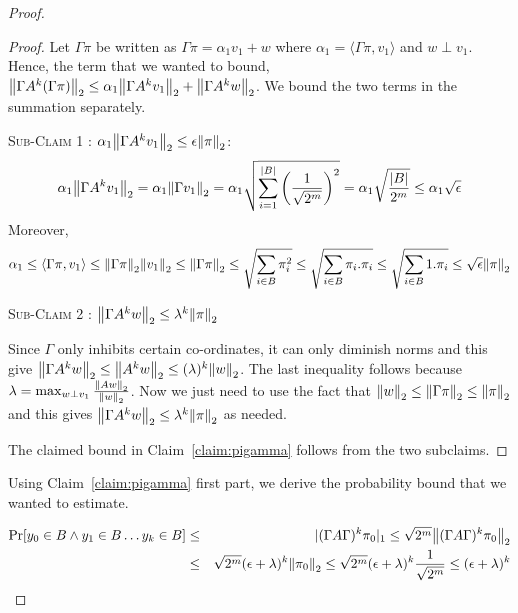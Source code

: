\begin{proof}
\begin{proof}
Let $\Gamma\pi$ be written as $\Gamma\pi = \alpha_1 v_1 + w$ where $\alpha_1 = \langle \Gamma \pi, v_1 \rangle$ and $w \perp v_1$. 
Hence, the term that we wanted to bound, ${\left\lVert\Gamma A^k (\Gamma \pi)\right\rVert}_2 \le \alpha_1 {\left\lVert\Gamma A^k v_1\right\rVert}_2 + {\left\lVert\Gamma A^k w\right\rVert}_2$. We bound the two terms in the summation separately.
\begin{description}
\item{\textsc{Sub-Claim 1} : ${\alpha_1 {\left\lVert\Gamma A^k v_1\right\rVert}_2 \le \epsilon{\left\lVert\pi\right\rVert}_2}$:}
$$ \alpha_1 {\left\lVert\Gamma A^k v_1\right\rVert}_2 = \alpha_1 {\left\lVert\Gamma v_1\right\rVert}_2 = \alpha_1 \sqrt{\sum_{i=1}^{|B|} \left( \frac{1}{\sqrt{2^{m}}} \right)^2 } = \alpha_1 \sqrt{\frac{|B|}{2^m}} \le \alpha_1 \sqrt{\epsilon}$$
Moreover, 
$$
\alpha_1 \le \langle \Gamma \pi, v_1 \rangle \le {\left\lVert\Gamma \pi\right\rVert}_2{\left\lVert v_1\right\rVert}_2 \le {\left\lVert\Gamma \pi\right\rVert}_2 \le \sqrt{\sum_{i \in B} \pi_i^2} \le  \sqrt{\sum_{i \in B} \pi_i.\pi_i} \le \sqrt{\sum_{i \in B} 1.\pi_i}  \le  \sqrt{\epsilon} {\left\lVert\pi\right\rVert}_2
$$

\item{\textsc{Sub-Claim 2} : ${\left\lVert\Gamma A^k w\right\rVert}_2 \le \lambda^k{\left\lVert\pi\right\rVert}_2$}

Since $\Gamma$ only inhibits certain co-ordinates, it can only diminish norms and this give ${\left\lVert\Gamma A^k w\right\rVert}_2 \le {\left\lVert A^kw\right\rVert}_2 \le (\lambda)^k{\left\lVert w\right\rVert}_2$. The last inequality follows because  $\lambda = \max_{w \perp v_1} \frac{{\left\lVert Aw\right\rVert}_2}{{\left\lVert w\right\rVert}_2}$. Now we just need to use the fact that ${\left\lVert w\right\rVert}_2 \le {\left\lVert\Gamma \pi\right\rVert}_2 \le {\left\lVert\pi\right\rVert}_2 $ and this gives ${\left\lVert\Gamma A^k w\right\rVert}_2 \le \lambda^k{\left\lVert\pi\right\rVert}_2$ as needed.
\end{description} 

\noindent The claimed bound in Claim~\ref{claim:pigamma} follows from the two subclaims. 
\end{proof}
\noindent Using Claim~\ref{claim:pigamma} first part, we derive the probability bound that we wanted to estimate.

\begin{eqnarray*}
\Pr[y_0 \in B \land y_1 \in B \ldots y_k \in B] & \le & |(\Gamma A\Gamma)^k \pi_0|_1 \le \sqrt{2^m}{\left\lVert(\Gamma A\Gamma)^k \pi_0\right\rVert}_2\\
& \le & \sqrt{2^m} (\epsilon+\lambda)^k {\left\lVert\pi_0\right\rVert}_2 \le \sqrt{2^m} (\epsilon+\lambda)^k \frac{1}{\sqrt{2^m}} \le (\epsilon+\lambda)^k
\end{eqnarray*}


\end{proof}

